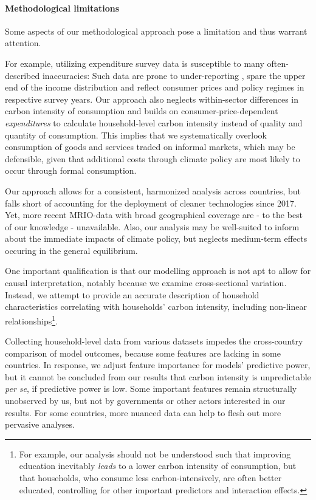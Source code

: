 \documentclass[12pt, a4paper]{article}
\begin{document}
\paragraph{Methodological limitations}

Some aspects of our methodological approach pose a limitation and thus warrant attention.

For example, utilizing expenditure survey data is susceptible to many often-described inaccuracies: Such data are prone to under-reporting \autocite{Meyer.2015}, spare the upper end of the income distribution \autocite{Blanchet.2022} and reflect consumer prices and policy regimes in respective survey years. Our approach also neglects within-sector differences in carbon intensity of consumption and builds on consumer-price-dependent \textit{expenditures} to calculate household-level carbon intensity instead of quality and quantity of consumption. This implies that we systematically overlook consumption of goods and services traded on informal markets, which may be defensible, given that additional costs through climate policy are most likely to occur through formal consumption.

Our approach allows for a consistent, harmonized analysis across countries, but falls short of accounting for the deployment of cleaner technologies since 2017. Yet, more recent MRIO-data with broad geographical coverage are - to the best of our knowledge - unavailable. Also, our analysis may be well-suited to inform about the immediate impacts of climate policy, but neglects medium-term effects occuring in the general equilibrium. 

One important qualification is that our modelling approach is not apt to allow for causal interpretation, notably because we examine cross-sectional variation. Instead, we attempt to provide an accurate description of household characteristics correlating with households' carbon intensity, including non-linear relationships\footnote{For example, our analysis should not be understood such that improving education inevitably \textit{leads} to a lower carbon intensity of consumption, but that households, who consume less carbon-intensively, are often better educated, controlling for other important predictors and interaction effects.}.

Collecting household-level data from various datasets impedes the cross-country comparison of model outcomes, because some features are lacking in some countries. In response, we adjust feature importance for models' predictive power, but it cannot be concluded from our results that carbon intensity is unpredictable \textit{per se}, if predictive power is low. Some important features remain structurally unobserved by us, but not by governments or other actors interested in our results. For some countries, more nuanced data can help to flesh out more pervasive analyses.
\end{document}
